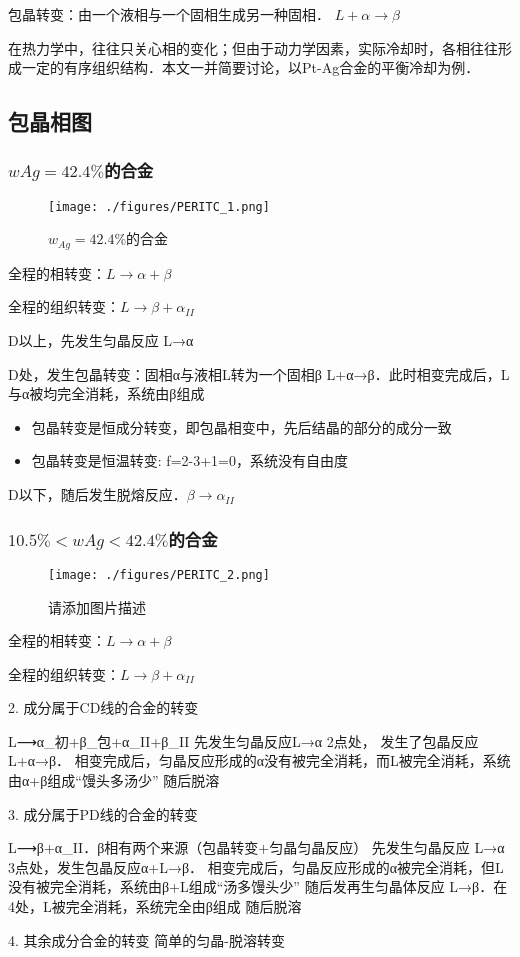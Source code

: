 包晶转变：由一个液相与一个固相生成另一种固相． $L + \alpha \rightarrow \beta$

在热力学中，往往只关心相的变化；但由于动力学因素，实际冷却时，各相往往形成一定的有序组织结构．本文一并简要讨论，以Pt-Ag合金的平衡冷却为例．

\subsection{包晶相图}
\subsubsection{$wAg=42.4\%$的合金} 

\begin{figure}[ht]
\centering
\texttt{[image: ./figures/PERITC\_1.png]}
\caption{$w_{Ag}=42.4\%$的合金} \label{PERITC_fig1}
\end{figure}

全程的相转变：$L \rightarrow \alpha+\beta$

全程的组织转变：$L \rightarrow \beta + \alpha_{II}$

D以上，先发生匀晶反应 L→α

D处，发生包晶转变：固相α与液相L转为一个固相β L+α→β．此时相变完成后，L与α被均完全消耗，系统由β组成
\begin{itemize}
\item 包晶转变是恒成分转变，即包晶相变中，先后结晶的部分的成分一致
\item 包晶转变是恒温转变: f=2-3+1=0，系统没有自由度
\end{itemize}
D以下，随后发生脱熔反应．$\beta \rightarrow \alpha_{II}$

\subsubsection{$10.5\%<wAg<42.4\%$的合金} 
\begin{figure}[ht]
\centering
\texttt{[image: ./figures/PERITC\_2.png]}
\caption{请添加图片描述} \label{PERITC_fig2}
\end{figure}
全程的相转变：$L \rightarrow \alpha+\beta$

全程的组织转变：$L \rightarrow \beta + \alpha_{II}$

2.  成分属于CD线的合金的转变
	 
	L⟶α_初+β_包+α_II+β_II
	先发生匀晶反应L→α
	2点处， 发生了包晶反应L+α→β．
	相变完成后，匀晶反应形成的α没有被完全消耗，而L被完全消耗，系统由α+β组成“馒头多汤少”
	随后脱溶

3.  成分属于PD线的合金的转变
	 
	L⟶β+α_II．β相有两个来源（包晶转变+匀晶匀晶反应）
	先发生匀晶反应 L→α
	3点处，发生包晶反应α+L→β．
	相变完成后，匀晶反应形成的α被完全消耗，但L没有被完全消耗，系统由β+L组成“汤多馒头少”
	随后发再生匀晶体反应 L→β．在4处，L被完全消耗，系统完全由β组成
	随后脱溶

4. 其余成分合金的转变
	简单的匀晶-脱溶转变
